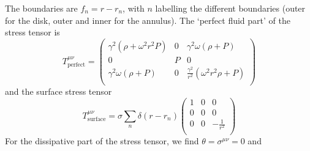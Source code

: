 \documentclass[12pt,a4paper]{article}
\begin{document}
The boundaries are $f_n = r-r_n$, with $n$ labelling the different
boundaries (outer for the disk, outer and inner for the annulus).
The `perfect fluid part' of the stress tensor is
%
\begin{equation}\label{blkstrour:eq}
  T^{\mu\nu}_\mathrm{perfect} =
   \begin{pmatrix}
     \gamma^2(\rho+\omega^2r^2P) & 0 & \gamma^2\omega(\rho+P) \\
     0                           & P & 0 \\
     \gamma^2\omega(\rho+P)      & 0 & \frac{\gamma^2}{r^2}(\omega^2r^2\rho+P) \\
   \end{pmatrix}
\end{equation}
%
and the surface stress tensor
%
\begin{equation}\label{srfstrour:eq}
  T^{\mu\nu}_\mathrm{surface} =
    \sigma \sum_n \delta(r-r_n)
  \begin{pmatrix}
    1 & 0 & 0 \\
    0 & 0 & 0 \\
    0 & 0 & -\frac{1}{r^2} \\
  \end{pmatrix}
\end{equation}
%
For the dissipative part of the stress tensor, we find
$\theta=\sigma^{\mu\nu}=0$ and
%
\end{document}
